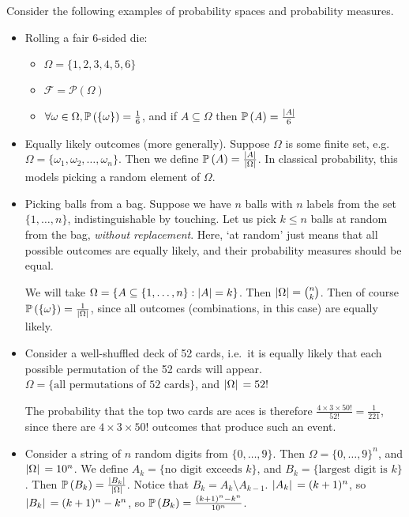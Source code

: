 \begin{example}
	Consider the following examples of probability spaces and probability measures.
\begin{itemize}
	\item Rolling a fair 6-sided die:
	      \begin{itemize}
		      \item \(\Omega = \{ 1, 2, 3, 4, 5, 6 \}\)
		      \item \(\mathcal F = \mathcal P(\Omega)\)
		      \item \(\forall \omega \in \Omega, \mathbb{P}\left({\{ \omega \}}\right) = \frac{1}{6}\), and if \(A \subseteq \Omega\) then \(\mathbb{P}\left({A}\right) = \frac{\abs{A}}{6}\)
	      \end{itemize}

	\item Equally likely outcomes (more generally).
	      Suppose \(\Omega\) is some finite set, e.g.
	      \(\Omega = \{ \omega_1, \omega_2, \dots, \omega_n \}\).
	      Then we define \(\mathbb{P}\left({A}\right) = \frac{\abs{A}}{\abs{\Omega}}\).
	      In classical probability, this models picking a random element of \(\Omega\).

	\item Picking balls from a bag.
	      Suppose we have \(n\) balls with \(n\) labels from the set \(\{1, \dots, n\}\), indistinguishable by touching.
	      Let us pick \(k \leq n\) balls at random from the bag, \textit{without replacement}.
	      Here, `at random' just means that all possible outcomes are equally likely, and their probability measures should be equal.

	      We will take \(\Omega = \{ A \subseteq \{1, \dots, n\} : \abs{A} = k \}\).
	      Then \(\abs{\Omega} = \binom{n}{k}\).
	      Then of course \(\mathbb{P}\left({\{ \omega \}}\right) = \frac{1}{\abs*{\Omega}}\), since all outcomes (combinations, in this case) are equally likely.

	\item Consider a well-shuffled deck of 52 cards, i.e.\ it is equally likely that each possible permutation of the 52 cards will appear.
	      \(\Omega = \{ \text{all permutations of 52 cards} \}\), and \(\abs*{\Omega} = 52!
	      \)

	      The probability that the top two cards are aces is therefore \(\frac{4 \times 3 \times 50!}{52!} = \frac{1}{221}\), since there are \(4 \times 3 \times 50!
	      \) outcomes that produce such an event.

	\item Consider a string of \(n\) random digits from \(\{0, \dots, 9\}\).
	      Then \(\Omega = \{ 0, \dots, 9 \}^n\), and \(\abs*{\Omega} = 10^n\).
	      We define \(A_k = \{ \text{no digit exceeds } k \}\), and \(B_k = \{ \text{largest digit is } k \}\).
	      Then \(\mathbb{P}\left({B_k}\right) = \frac{\abs*{B_k}}{\abs*{\Omega}}\).
	      Notice that \(B_k = A_k \setminus A_{k-1}\).
	      \(\abs*{A_k} = (k+1)^n\), so \(\abs*{B_k} = (k+1)^n - k^n\), so \(\mathbb{P}\left({B_k}\right) = \frac{(k+1)^n - k^n}{10^n}\).


\end{itemize}
\end{example}
